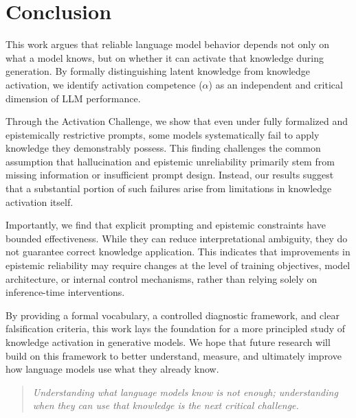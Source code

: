 
\section{Conclusion}

This work argues that reliable language model behavior depends not only on what a model knows, but on whether it can activate that knowledge during generation. By formally distinguishing latent knowledge from knowledge activation, we identify activation competence ($\alpha$) as an independent and critical dimension of LLM performance.

Through the Activation Challenge, we show that even under fully formalized and epistemically restrictive prompts, some models systematically fail to apply knowledge they demonstrably possess. This finding challenges the common assumption that hallucination and epistemic unreliability primarily stem from missing information or insufficient prompt design. Instead, our results suggest that a substantial portion of such failures arise from limitations in knowledge activation itself.

Importantly, we find that explicit prompting and epistemic constraints have bounded effectiveness. While they can reduce interpretational ambiguity, they do not guarantee correct knowledge application. This indicates that improvements in epistemic reliability may require changes at the level of training objectives, model architecture, or internal control mechanisms, rather than relying solely on inference-time interventions.

By providing a formal vocabulary, a controlled diagnostic framework, and clear falsification criteria, this work lays the foundation for a more principled study of knowledge activation in generative models. We hope that future research will build on this framework to better understand, measure, and ultimately improve how language models use what they already know.

\vspace{0.5em}
\begin{quote}
\textit{Understanding what language models know is not enough; understanding when they can use that knowledge is the next critical challenge.}
\end{quote}


%
%
